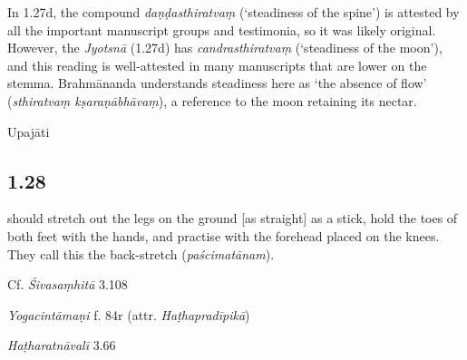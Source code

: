 \begin{ekdosis}
\begin{philcomm}[hp01_027]
In 1.27d, the compound \emph{daṇḍasthiratvaṃ} (`steadiness of the spine') is attested by all the important manuscript groups and testimonia, so it was likely original. However, the \emph{Jyotsnā} (1.27d) has \emph{candrasthiratvaṃ} (`steadiness of the moon'), and this reading is well-attested in many manuscripts that are lower on the stemma. Brahmānanda understands steadiness here as `the absence of flow' (\emph{sthiratvaṃ kṣaraṇābhāvaṃ}), a reference to the moon retaining its nectar.
\end{philcomm}

\begin{metre}[hp01_027]
Upajāti
\end{metre}

\subsection*{1.28}
\begin{translation} should stretch out the legs on the ground [as straight] as a stick, hold the toes of both feet with the hands, and practise with the forehead placed on the knees. They call this the back-stretch (\emph{paścimatānam}).
\end{translation}

\begin{sources}[hp01_028]
Cf. \emph{Śivasaṃhitā} 3.108

\begin{versinnote}
\end{versinnote}

\end{sources}

\begin{testimonia}[hp01_028]
\emph{Yogacintāmaṇi} f. 84r (attr. \emph{Haṭhapradīpikā})

\begin{versinnote}
\end{versinnote}

\emph{Haṭharatnāvalī} 3.66


\end{testimonia}
\end{ekdosis}
